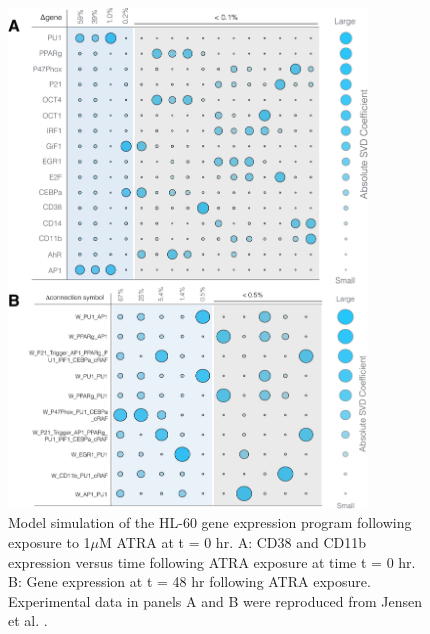 \documentclass[12pt]{article}
\begin{document}
\begin{figure}[!t]\centering
\includegraphics[width=0.85\textwidth]{./figs/Fig-6-GRN-Robustness.pdf}
\caption{Model simulation of the HL-60 gene expression program following exposure to 1$\mu$M ATRA at t = 0 hr.
A: CD38 and CD11b expression versus time following ATRA exposure at time t = 0 hr.
B: Gene expression at t = 48 hr following ATRA exposure.
Experimental data in panels A and B were reproduced from Jensen et al. \cite{Jensen:2015aa}.}\label{fig:model-grn-simulations}
\end{figure}
\end{document}
